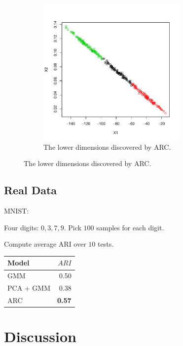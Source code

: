 \documentclass[12pt]{article}
\begin{document}
\begin{figure}[H]
\begin{subfigure}[b]{0.32\textwidth}
 \includegraphics[width=0.8\textwidth]{pics/simARCX}
  \caption{The lower dimensions discovered by ARC.}
\end{subfigure}
 \end{figure}

\subsection{Real Data}


MNIST:


Four digits: $0,3,7,9$. Pick $100$ samples for each digit.

Compute average ARI over $10$ tests.

\begin{table}[H]
\centering
	\begin{tabular}{| l | r |}
	\hline
			Model & $ARI$ \\
	\hline
			GMM & 0.50 \\
			PCA + GMM &  0.38  \\
			ARC		& {\bf 0.57} \\
			\hline
	\end{tabular}
\end{table}



\section{Discussion}




\end{document}
